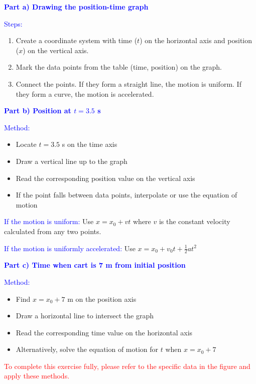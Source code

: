 \begin{exercise}
\begin{solu}
        \textbf{\textcolor{blue}{Part a) Drawing the position-time graph}}

        \textcolor{blue}{Steps:}
        \begin{enumerate}
            \item Create a coordinate system with time ($t$) on the horizontal axis and position ($x$) on the vertical axis.
            \item Mark the data points from the table (time, position) on the graph.
            \item Connect the points. If they form a straight line, the motion is uniform. If they form a curve, the motion is accelerated.
        \end{enumerate}

        \textbf{\textcolor{blue}{Part b) Position at $t = 3.5$ s}}

        \textcolor{blue}{Method:}
        \begin{itemize}
            \item Locate $t = 3.5$ s on the time axis
            \item Draw a vertical line up to the graph
            \item Read the corresponding position value on the vertical axis
            \item If the point falls between data points, interpolate or use the equation of motion
        \end{itemize}

        \textcolor{blue}{If the motion is uniform:} Use $x = x_0 + vt$ where $v$ is the constant velocity calculated from any two points.

        \textcolor{blue}{If the motion is uniformly accelerated:} Use $x = x_0 + v_0 t + \frac{1}{2}at^2$

        \textbf{\textcolor{blue}{Part c) Time when cart is 7 m from initial position}}

        \textcolor{blue}{Method:}
        \begin{itemize}
            \item Find $x = x_0 + 7$ m on the position axis
            \item Draw a horizontal line to intersect the graph
            \item Read the corresponding time value on the horizontal axis
            \item Alternatively, solve the equation of motion for $t$ when $x = x_0 + 7$
        \end{itemize}

        \textcolor{red}{To complete this exercise fully, please refer to the specific data in the figure and apply these methods.}
    \end{solu}
\end{exercise}

